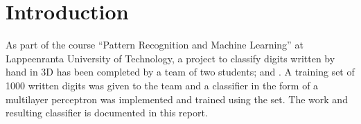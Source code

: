 \documentclass[report.tex]{subfile}
\begin{document}
\vfill
\section{Introduction}

As part of the course ``Pattern Recognition and Machine Learning'' at
Lappeenranta University of Technology, a project to classify digits written by
hand in 3D has been completed by a team of two students; \authorA{} and
\authorB{}. A training set of 1000 written digits was given to the team and a
classifier in the form of a multilayer perceptron was implemented and trained
using the set. The work and resulting classifier is documented in this report.
\vfill
\end{document}
